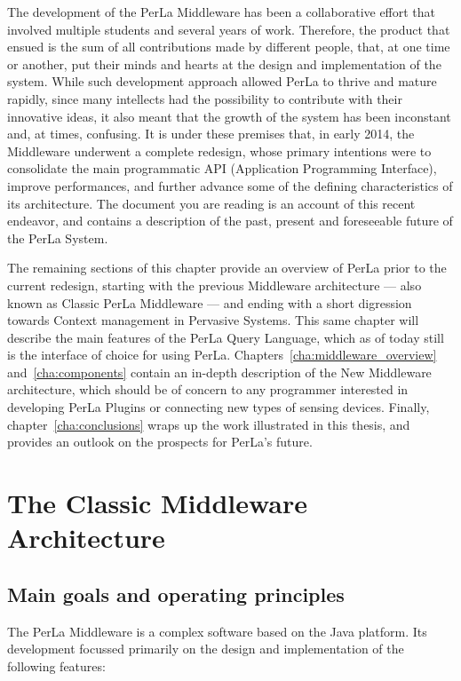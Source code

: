 The development of the PerLa Middleware has been a collaborative effort that
involved multiple students and several years of work. Therefore, the product
that ensued is the sum of all contributions made by different people, that, at
one time or another, put their minds and hearts at the design and
implementation of the system. While such development approach allowed PerLa to
thrive and mature rapidly, since many intellects had the possibility to
contribute with their innovative ideas, it also meant that the growth of the
system has been inconstant and, at times, confusing. It is under these premises
that, in early 2014, the Middleware underwent a complete redesign, whose
primary intentions were to consolidate the main programmatic API (Application
Programming Interface), improve performances, and further advance some of the
defining characteristics of its architecture. The document you are reading is
an account of this recent endeavor, and contains a description of the past,
present and foreseeable future of the PerLa System.

The remaining sections of this chapter provide an overview of PerLa prior to
the current redesign, starting with the previous Middleware architecture ---
also known as Classic PerLa Middleware --- and ending with a short digression
towards Context management in Pervasive Systems. This same chapter will
describe the main features of the PerLa Query Language, which as of today still
is the interface of choice for using PerLa.
Chapters~\ref{cha:middleware_overview} and~\ref{cha:components} contain an
in-depth description of the New Middleware architecture, which should be of
concern to any programmer interested in developing PerLa Plugins or connecting
new types of sensing devices. Finally, chapter~\ref{cha:conclusions} wraps up
the work illustrated in this thesis, and provides an outlook on the prospects
for PerLa's future.


\section{The Classic Middleware Architecture}

\subsection{Main goals and operating principles}

The PerLa Middleware is a complex software based on the Java platform. Its
development focussed primarily on the design and implementation of the
following features:

